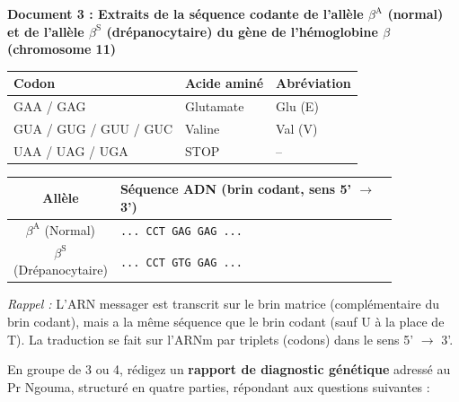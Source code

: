 \documentclass[11pt]{article}
\newcounter{popsec}
\newcounter{popsub}
\newcommand{\courssub}[1]{%
  \stepcounter{popsub}%
  \par\vspace{9pt}\noindent{\popxbold\fontsize{11.5}{13}\selectfont\color{popink}{\color{poporange}\thepopsec.\thepopsub}\hspace{6pt}#1}\par\nopagebreak\vspace{4pt}
}
\begin{document}
\begin{center}
\textbf{Document 3 : Extraits de la séquence codante de l'allèle $\beta^{\text{A}}$ (normal) et de l'allèle $\beta^{\text{S}}$ (drépanocytaire) du gène de l'hémoglobine $\beta$ (chromosome 11)}
\end{center}
\begin{definition}
\begin{center}
\begin{tabular}{lll}
\hline
\textbf{Codon} & \textbf{Acide aminé} & \textbf{Abréviation} \\
\hline
GAA / GAG & Glutamate & Glu (E) \\
GUA / GUG / GUU / GUC & Valine & Val (V) \\
UAA / UAG / UGA & STOP & -- \\
\hline
\end{tabular}
\end{center}
\end{definition}

\begin{center}
\begin{tabular}{|c|p{0.85\linewidth}|}
\hline
\textbf{Allèle} & \textbf{Séquence ADN (brin codant, sens 5' $\to$ 3')} \\
\hline
$\beta^{\text{A}}$ (Normal) & \texttt{... CCT GAG GAG ...} \\
\hline
$\beta^{\text{S}}$ (Drépanocytaire) & \texttt{... CCT GTG GAG ...} \\
\hline
\end{tabular}
\end{center}
\emph{Rappel :} L'ARN messager est transcrit sur le brin matrice (complémentaire du brin codant), mais a la même séquence que le brin codant (sauf U à la place de T). La traduction se fait sur l'ARNm par triplets (codons) dans le sens 5' $\to$ 3'.

\courssub{Consignes}
En groupe de 3 ou 4, rédigez un \textbf{rapport de diagnostic génétique} adressé au Pr Ngouma, structuré en quatre parties, répondant aux questions suivantes :
\end{document}
